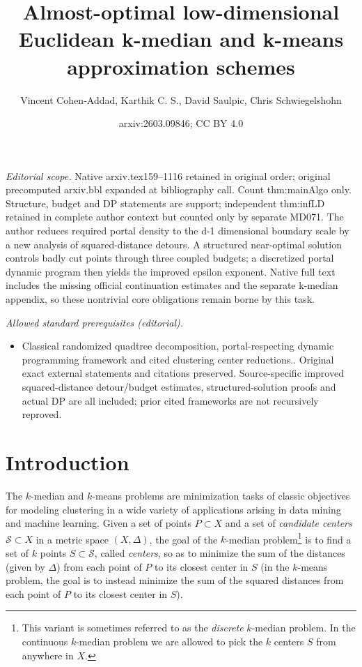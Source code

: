 \documentclass[11pt]{article}
\title{Almost-optimal low-dimensional Euclidean k-median and k-means approximation schemes}
\author{Vincent Cohen-Addad, Karthik C. S., David Saulpic, Chris Schwiegelshohn}
\date{arxiv:2603.09846; CC BY 4.0}
\newcommand{\calS}{\mathcal {S}}
\begin{document}
\maketitle
\noindent\textit{Editorial scope.} Native arxiv.tex159–1116 retained in original order; original precomputed arxiv.bbl expanded at bibliography call. Count thm:mainAlgo only. Structure, budget and DP statements are support; independent thm:infLD retained in complete author context but counted only by separate MD071. The author reduces required portal density to the d-1 dimensional boundary scale by a new analysis of squared-distance detours. A structured near-optimal solution controls badly cut points through three coupled budgets; a discretized portal dynamic program then yields the improved epsilon exponent. Native full text includes the missing official continuation estimates and the separate k-median appendix, so these nontrivial core obligations remain borne by this task.\par\medskip
\noindent\textit{Allowed standard prerequisites (editorial).}\begin{itemize}
\item Classical randomized quadtree decomposition, portal-respecting dynamic programming framework and cited clustering center reductions.. Original exact external statements and citations preserved. Source-specific improved squared-distance detour/budget estimates, structured-solution proofs and actual DP are all included; prior cited frameworks are not recursively reproved.
\end{itemize}\medskip
\section{Introduction}
The $k$-median and $k$-means problems are minimization tasks of classic objectives for modeling
clustering in a wide variety of applications arising in data mining and
machine learning. Given a set of points $P\subset X$  and a set of \emph{candidate centers} $\calS \subset X$ in a metric space $(X, \Delta)$,
the goal of the $k$-median problem\footnote{This variant is sometimes referred to as the \emph{discrete} $k$-median problem. In the continuous $k$-median problem we are allowed to pick the $k$ centers $S$ from anywhere in $X$. } is to find a set of $k$ points $S \subset \calS$, called \emph{centers}, so as
to minimize the sum of the distances (given by $\Delta$) from each point of $P$ to its closest
center in $S$ (in the $k$-means problem, the goal is to instead minimize the sum of the squared distances from each point of $P$ to its closest center in $S$).
\end{document}
